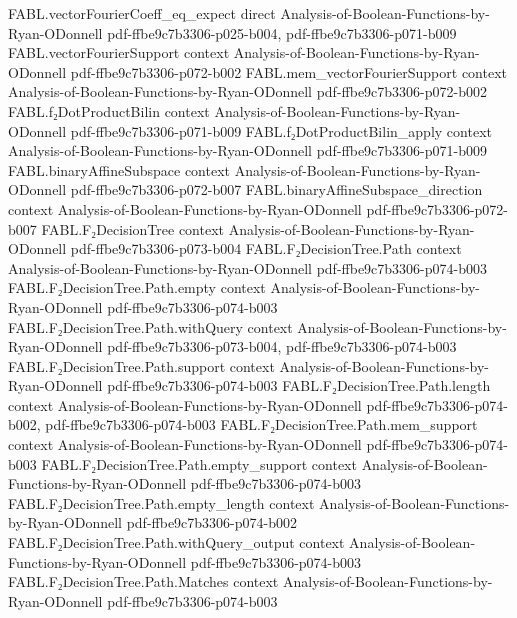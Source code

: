 \begin{theorem}
\proofstep
  {FABL.vectorFourierCoeff_eq_expect}
  {direct}
  {Analysis-of-Boolean-Functions-by-Ryan-ODonnell}
  {pdf-ffbe9c7b3306-p025-b004,
    pdf-ffbe9c7b3306-p071-b009}
\proofstep
  {FABL.vectorFourierSupport}
  {context}
  {Analysis-of-Boolean-Functions-by-Ryan-ODonnell}
  {pdf-ffbe9c7b3306-p072-b002}
\proofstep
  {FABL.mem_vectorFourierSupport}
  {context}
  {Analysis-of-Boolean-Functions-by-Ryan-ODonnell}
  {pdf-ffbe9c7b3306-p072-b002}
\proofstep
  {FABL.f₂DotProductBilin}
  {context}
  {Analysis-of-Boolean-Functions-by-Ryan-ODonnell}
  {pdf-ffbe9c7b3306-p071-b009}
\proofstep
  {FABL.f₂DotProductBilin_apply}
  {context}
  {Analysis-of-Boolean-Functions-by-Ryan-ODonnell}
  {pdf-ffbe9c7b3306-p071-b009}
\proofstep
  {FABL.binaryAffineSubspace}
  {context}
  {Analysis-of-Boolean-Functions-by-Ryan-ODonnell}
  {pdf-ffbe9c7b3306-p072-b007}
\proofstep
  {FABL.binaryAffineSubspace_direction}
  {context}
  {Analysis-of-Boolean-Functions-by-Ryan-ODonnell}
  {pdf-ffbe9c7b3306-p072-b007}
\proofstep
  {FABL.F₂DecisionTree}
  {context}
  {Analysis-of-Boolean-Functions-by-Ryan-ODonnell}
  {pdf-ffbe9c7b3306-p073-b004}
\proofstep
  {FABL.F₂DecisionTree.Path}
  {context}
  {Analysis-of-Boolean-Functions-by-Ryan-ODonnell}
  {pdf-ffbe9c7b3306-p074-b003}
\proofstep
  {FABL.F₂DecisionTree.Path.empty}
  {context}
  {Analysis-of-Boolean-Functions-by-Ryan-ODonnell}
  {pdf-ffbe9c7b3306-p074-b003}
\proofstep
  {FABL.F₂DecisionTree.Path.withQuery}
  {context}
  {Analysis-of-Boolean-Functions-by-Ryan-ODonnell}
  {pdf-ffbe9c7b3306-p073-b004,
    pdf-ffbe9c7b3306-p074-b003}
\proofstep
  {FABL.F₂DecisionTree.Path.support}
  {context}
  {Analysis-of-Boolean-Functions-by-Ryan-ODonnell}
  {pdf-ffbe9c7b3306-p074-b003}
\proofstep
  {FABL.F₂DecisionTree.Path.length}
  {context}
  {Analysis-of-Boolean-Functions-by-Ryan-ODonnell}
  {pdf-ffbe9c7b3306-p074-b002,
    pdf-ffbe9c7b3306-p074-b003}
\proofstep
  {FABL.F₂DecisionTree.Path.mem_support}
  {context}
  {Analysis-of-Boolean-Functions-by-Ryan-ODonnell}
  {pdf-ffbe9c7b3306-p074-b003}
\proofstep
  {FABL.F₂DecisionTree.Path.empty_support}
  {context}
  {Analysis-of-Boolean-Functions-by-Ryan-ODonnell}
  {pdf-ffbe9c7b3306-p074-b003}
\proofstep
  {FABL.F₂DecisionTree.Path.empty_length}
  {context}
  {Analysis-of-Boolean-Functions-by-Ryan-ODonnell}
  {pdf-ffbe9c7b3306-p074-b002}
\proofstep
  {FABL.F₂DecisionTree.Path.withQuery_output}
  {context}
  {Analysis-of-Boolean-Functions-by-Ryan-ODonnell}
  {pdf-ffbe9c7b3306-p074-b003}
\proofstep
  {FABL.F₂DecisionTree.Path.Matches}
  {context}
  {Analysis-of-Boolean-Functions-by-Ryan-ODonnell}
  {pdf-ffbe9c7b3306-p074-b003}

\end{theorem}
